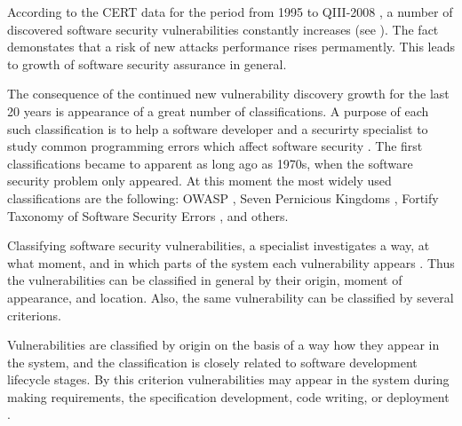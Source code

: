 %
According to the CERT data for the period from 1995 to QIII-2008 , a number of discovered software security vulnerabilities constantly increases (see ). 
%
The fact demonstates that a risk of new attacks performance rises permamently. 
%
This leads to growth of software security assurance in general. 


%
The consequence of the continued new vulnerability discovery growth for the last 20 years is appearance of a great number of classifications. 
%
A purpose of each such classification is to help a software developer and a securirty specialist to study common programming errors which affect software security . 
%
The first classifications became to apparent as long ago as 1970s, when the software security problem only appeared. 
%
At this moment the most widely used classifications are the following: OWASP , Seven Pernicious Kingdoms , Fortify Taxonomy of Software Security Errors , and others. 



%
Classifying software security vulnerabilities, a specialist investigates a way, at what moment, and in which parts of the system each vulnerability appears   . 
%
Thus the vulnerabilities can be classified in general by their origin, moment of appearance, and location. 
%
Also, the same vulnerability can be classified by several criterions. 

%
Vulnerabilities are classified by origin on the basis of a way how they appear in the system, and the classification is closely related to software development lifecycle stages. 
%
By this criterion vulnerabilities may appear in the system during making requirements, the specification development, code writing, or deployment  . 

